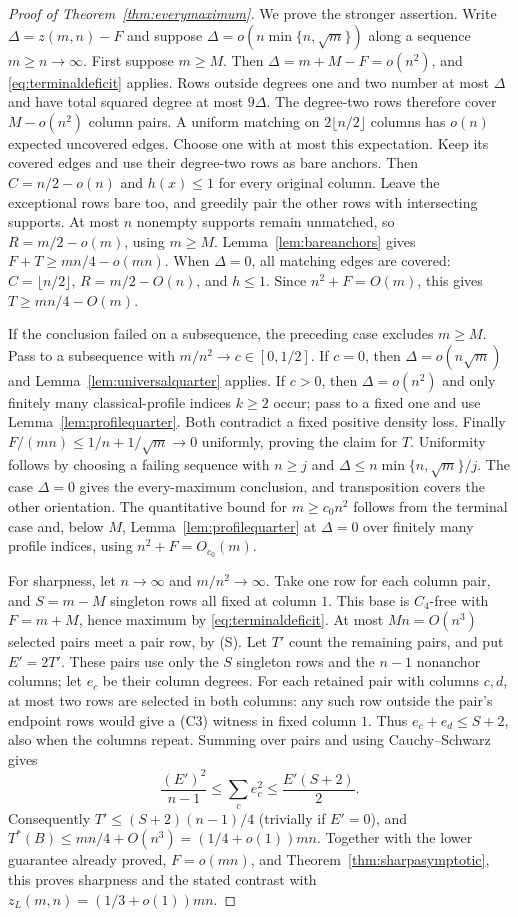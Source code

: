 \documentclass[11pt]{article}
\newcommand{\zl}{z_L}
\begin{document}
\begin{proof}[Proof of Theorem~\ref{thm:everymaximum}]
We prove the stronger assertion. Write $\Delta=z(m,n)-F$ and suppose
$\Delta=o(n\min\{n,\sqrt m\})$ along a sequence $m\ge n\to\infty$.
First suppose $m\ge M$. Then $\Delta=m+M-F=o(n^2)$,
and \eqref{eq:terminaldeficit} applies.
Rows outside degrees one and two number at most $\Delta$ and have
total squared degree at most $9\Delta$. The degree-two rows therefore
cover $M-o(n^2)$ column pairs. A uniform matching on
$2\lfloor n/2\rfloor$ columns has $o(n)$ expected uncovered edges.
Choose one with at most this expectation.
Keep its covered edges and use their degree-two rows as bare anchors.
Then $C=n/2-o(n)$ and $h(x)\le1$ for every original column.
Leave the exceptional rows bare too, and greedily pair the other rows
with intersecting supports. At most $n$ nonempty supports remain
unmatched, so $R=m/2-o(m)$, using $m\ge M$.
Lemma~\ref{lem:bareanchors} gives $F+T\ge mn/4-o(mn)$.
When $\Delta=0$, all matching edges are covered:
$C=\lfloor n/2\rfloor$, $R=m/2-O(n)$, and $h\le1$.
Since $n^2+F=O(m)$, this gives $T\ge mn/4-O(m)$.

If the conclusion failed on a subsequence, the preceding case excludes $m\ge M$.
Pass to a subsequence with $m/n^2\to c\in[0,1/2]$. If $c=0$,
then $\Delta=o(n\sqrt m)$ and Lemma~\ref{lem:universalquarter} applies.
If $c>0$, then $\Delta=o(n^2)$ and only finitely
many classical-profile indices $k\ge2$ occur; pass to a fixed one
and use Lemma~\ref{lem:profilequarter}. Both contradict a fixed
positive density loss. Finally
$F/(mn)\le1/n+1/\sqrt m\to0$ uniformly, proving the claim for $T$.
Uniformity follows by choosing a failing sequence with $n\ge j$ and
$\Delta\le n\min\{n,\sqrt m\}/j$. The case $\Delta=0$ gives the
every-maximum conclusion, and transposition covers the other orientation.
The quantitative bound for $m\ge c_0n^2$ follows from the terminal case and,
below $M$, Lemma~\ref{lem:profilequarter} at $\Delta=0$ over finitely many
profile indices, using $n^2+F=O_{c_0}(m)$.

For sharpness, let $n\to\infty$ and $m/n^2\to\infty$. Take one
row for each column pair, and $S=m-M$ singleton rows all fixed at
column $1$. This base is $C_4$-free with $F=m+M$, hence maximum by
\eqref{eq:terminaldeficit}. At most $Mn=O(n^3)$ selected pairs meet
a pair row, by (S). Let $T'$ count the remaining pairs, and put
$E'=2T'$. These pairs use only the $S$ singleton rows and the $n-1$
nonanchor columns; let $e_c$ be their column degrees.
For each retained pair with columns $c,d$, at most two rows are
selected in both columns: any such row outside the pair's endpoint
rows would give a (C3) witness in fixed column $1$.
Thus $e_c+e_d\le S+2$, also when the columns repeat. Summing over
pairs and using Cauchy--Schwarz gives
\[
 \frac{(E')^2}{n-1}\le\sum_c e_c^2\le\frac{E'(S+2)}2.
\]
Consequently $T'\le(S+2)(n-1)/4$ (trivially if $E'=0$), and
$T^*(B)\le mn/4+O(n^3)=(1/4+o(1))mn$.
Together with the lower guarantee already proved, $F=o(mn)$, and
Theorem~\ref{thm:sharpasymptotic}, this proves sharpness and the stated
contrast with $\zl(m,n)=(1/3+o(1))mn$.
\end{proof}
\end{document}
